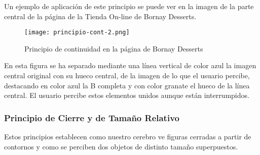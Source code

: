 \begin{itemize}
    Un ejemplo de aplicación de este principio se puede ver en la imagen de la parte central de la página de la Tienda On-line de Bornay Desserts.

    \begin{figure}[H]
        \centering
        \texttt{[image: principio-cont-2.png]}
        \caption{Principio de continuidad en la página de Bornay Desserts}
    \end{figure}

    En esta figura se ha separado mediante una línea vertical de color azul la imagen central original con su hueco central, de la imagen de lo que el usuario percibe, destacando en color azul la B completa y con color granate el hueco de la línea central. El usuario percibe estos elementos unidos aunque están interrumpidos.
\end{itemize}

\subsubsection{Principio de Cierre y de Tamaño Relativo}
Estos principios establecen como nuestro cerebro ve figuras cerradas a partir de contornos y como se perciben dos objetos de distinto tamaño superpuestos.

